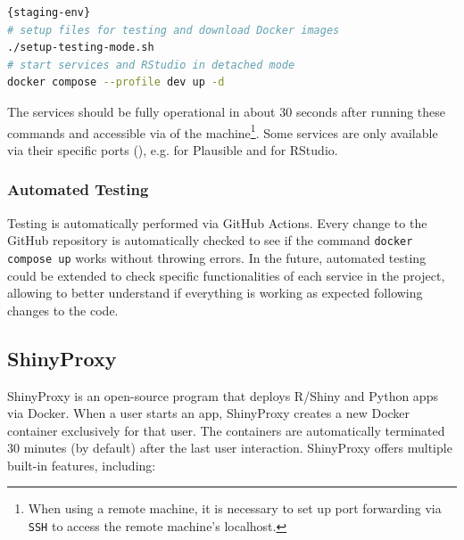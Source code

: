 \begin{lstlisting}[caption=Setup testing environment.,language=bash,label={lst:staging-env}]{staging-env}
# setup files for testing and download Docker images
./setup-testing-mode.sh
# start services and RStudio in detached mode
docker compose --profile dev up -d
\end{lstlisting}

The services should be fully operational in about 30 seconds after running these commands and accessible via  of the machine\footnote{When using a remote machine, it is necessary to set up port forwarding via \texttt{SSH} to access the remote machine's localhost.}. Some services are only available via their specific ports (), e.g.  for Plausible and  for RStudio.

\subsubsection{Automated Testing}

Testing is automatically performed via GitHub Actions. Every change to the GitHub repository is automatically checked to see if the command \texttt{docker compose up} works without throwing errors. In the future, automated testing could be extended to check specific functionalities of each service in the project, allowing to better understand if everything is working as expected following changes to the code.

\subsection{ShinyProxy}

ShinyProxy is an open-source program that deploys R/Shiny and Python apps via Docker. When a user starts an app, ShinyProxy creates a new Docker container exclusively for that user. The containers are automatically terminated 30 minutes (by default) after the last user interaction. ShinyProxy offers multiple built-in features, including:

